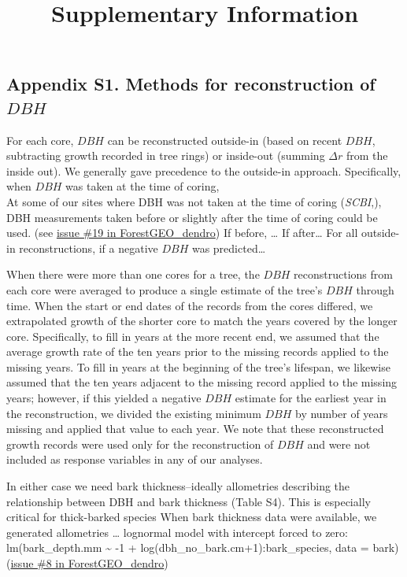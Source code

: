 \documentclass[
]{article}
\title{Supplementary Information}
\author{}
\date{\vspace{-2.5em}}
\begin{document}
\maketitle

{
\setcounter{tocdepth}{3}
\tableofcontents
}
\newpage

\hypertarget{appendix-s1.-methods-for-reconstruction-of-dbh}{%
\subsection{\texorpdfstring{Appendix S1. Methods for reconstruction of
\(DBH\)}{Appendix S1. Methods for reconstruction of DBH}}\label{appendix-s1.-methods-for-reconstruction-of-dbh}}

For each core, \(DBH\) can be reconstructed outside-in (based on recent
\(DBH\), subtracting growth recorded in tree rings) or inside-out
(summing \(\Delta r\) from the inside out). We generally gave precedence
to the outside-in approach. Specifically, when \(DBH\) was taken at the
time of coring,\\
At some of our sites where DBH was not taken at the time of coring
(\emph{SCBI},), DBH measurements taken before or slightly after the time
of coring could be used. (see
\href{https://github.com/EcoClimLab/ForestGEO_dendro/issues/19}{issue
\#19 in ForestGEO\_dendro}) If before, \ldots{} If after\ldots{} For all
outside-in reconstructions, if a negative \(DBH\) was predicted\ldots{}

When there were more than one cores for a tree, the \(DBH\)
reconstructions from each core were averaged to produce a single
estimate of the tree's \(DBH\) through time. When the start or end dates
of the records from the cores differed, we extrapolated growth of the
shorter core to match the years covered by the longer core.
Specifically, to fill in years at the more recent end, we assumed that
the average growth rate of the ten years prior to the missing records
applied to the missing years. To fill in years at the beginning of the
tree's lifespan, we likewise assumed that the ten years adjacent to the
missing record applied to the missing years; however, if this yielded a
negative \(DBH\) estimate for the earliest year in the reconstruction,
we divided the existing minimum \(DBH\) by number of years missing and
applied that value to each year. We note that these reconstructed growth
records were used only for the reconstruction of \(DBH\) and were not
included as response variables in any of our analyses.

In either case we need bark thickness--ideally allometries describing
the relationship between DBH and bark thickness (Table S4). This is
especially critical for thick-barked species When bark thickness data
were available, we generated allometries \ldots{} lognormal model with
intercept forced to zero: lm(bark\_depth.mm \textasciitilde{} -1 +
log(dbh\_no\_bark.cm+1):bark\_species, data = bark)
(\href{https://github.com/EcoClimLab/ForestGEO_dendro/issues/8}{issue
\#8 in ForestGEO\_dendro})
\end{document}
